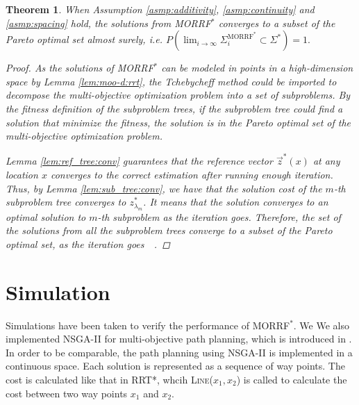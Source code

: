 \documentclass[conference]{IEEEtran}
\newtheorem{thm}{Theorem}
\begin{document}
\begin{thm}
\label{thm:morrt:conv}
When Assumption \ref{asmp:additivity}, \ref{asmp:continuity} and \ref{asmp:spacing} hold,
the solutions from MORRF$^{*} $ converges to a subset of the Pareto optimal set almost surely, i.e.
$
P( \lim_{ i \rightarrow \infty }  \Sigma^{\mbox{MORRF}^{*}}_{i}  \subset \Sigma^{*} ) = 1.
$
\begin{proof}
As the solutions of MORRF$^{*}$ can be modeled in points in a high-dimension space by Lemma \ref{lem:moo-d:rrt}, the Tchebycheff method could be imported to decompose the multi-objective optimization problem into a set of subproblems.
By the fitness definition of the subproblem trees, if the subproblem tree could find a solution that minimize the fitness, the solution is in the Pareto optimal set of the multi-objective optimization problem.

Lemma \ref{lem:ref_tree:conv} guarantees that the reference vector $ \vec{z}^{*}(x) $ at any location $ x $ converges to the correct estimation after running enough iteration.
Thus, by Lemma \ref{lem:sub_tree:conv}, we have that the solution cost of the $ m $-th subproblem tree converges to $ z^{*}_{ \lambda_{m} } $.
It means that the solution converges to an optimal solution to $ m $-th subproblem as the iteration goes.
Therefore, the set of the solutions from all the subproblem trees converge to a subset of the Pareto optimal set, as the iteration goes~\cite{4358754}~\cite{miettinen1999nonlinear}.
\end{proof}
\end{thm}

\section{Simulation}
\label{sec:simulation}

Simulations have been taken to verify the performance of MORRF$^{*}$.
We 
We also implemented NSGA-II for multi-objective path planning, which is introduced in \cite{Ahmed2013}.
In order to be comparable, the path planning using NSGA-II is implemented in a continuous space.
Each solution is represented as a sequence of way points.
The cost is calculated like that in RRT*, whcih \textsc{Line}($ x_{1}, x_{2} $) is called to calculate the cost between two way points $ x_{1} $ and $ x_{2} $.
\end{document}

